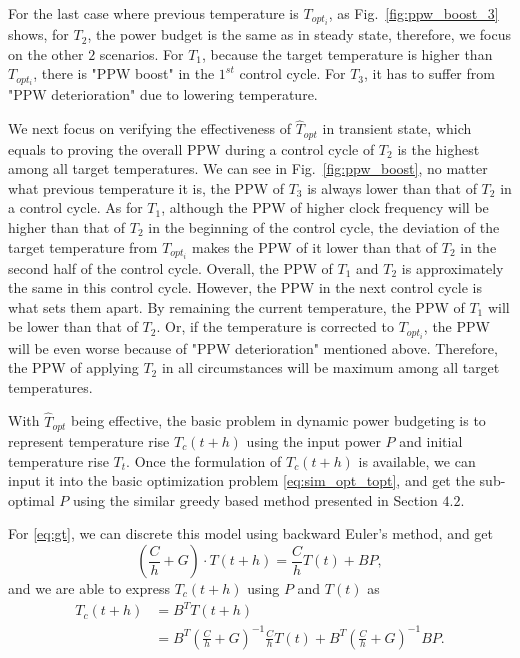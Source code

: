 For the last case where previous temperature is $T_{opt_{i}}$, as Fig.~\ref{fig:ppw_boost_3} shows, for $T_{2}$, the power budget is the same as in steady state, therefore, we focus on the other $2$ scenarios. For $T_{1}$, because the target temperature is higher than $T_{opt_{i}}$, there is "PPW boost" in the $1^{st}$ control cycle. For $T_{3}$, it has to suffer from "PPW deterioration" due to lowering temperature.


We next focus on verifying the effectiveness of $\hat{T}_{opt}$ in transient state, which equals to proving the overall PPW during a control cycle of $T_{2}$ is the highest among all target temperatures. We can see in Fig.~\ref{fig:ppw_boost}, no matter what previous temperature it is, the PPW of $T_{3}$ is always lower than that of $T_{2}$ in a control cycle. As for $T_{1}$, although the PPW of higher clock frequency will be higher than that of $T_{2}$ in the beginning of the control cycle, the deviation of the target temperature from $T_{opt_{i}}$ makes the PPW of it lower than that of $T_{2}$ in the second half of the control cycle. Overall, the PPW of $T_{1}$ and $T_{2}$ is approximately the same in this control cycle. However, the PPW in the next control cycle is what sets them apart. By remaining the current temperature, the PPW of $T_{1}$ will be lower than that of $T_{2}$. Or, if the temperature is corrected to $T_{opt_{i}}$, the PPW will be even worse because of "PPW deterioration" mentioned above. Therefore, the PPW of applying $T_{2}$ in all circumstances will be maximum among all target temperatures.

With $\hat{T}_{opt}$ being effective, the basic problem in dynamic power budgeting is to represent temperature rise $T_{c}(t+h)$ using the input power $P$ and initial temperature rise $T_{t}$. Once the formulation of $T_{c}(t+h)$ is available, we can input it into the basic optimization problem \eqref{eq:sim_opt_topt}, and get the sub-optimal $P$ using the similar greedy based method presented in Section $4.2$.

For \eqref{eq:gt}, we can discrete this model using backward Euler's method, and get
\begin{equation}\label{eq:discrete_gt}
(\frac{C}{h}+G)\cdot T(t+h)=\frac{C}{h}T(t)+BP,
\end{equation}
and we are able to express $T_{c}(t+h)$ using $P$ and $T(t)$ as
\begin{equation}\label{eq:discrete_tc}
  \begin{split}
T_{c}(t+h)&=B^{T}T(t+h)\\
&=B^{T}(\frac{C}{h}+G)^{-1}\frac{C}{h}T(t)+B^{T}(\frac{C}{h}+G)^{-1}BP.
  \end{split}
\end{equation}

